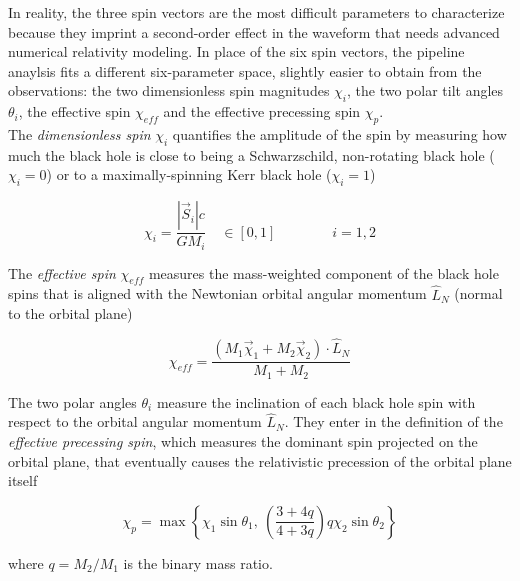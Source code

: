 \documentclass[a4paper,titlepage]{book}     	%
\begin{document}
In reality, the three spin vectors are the most difficult parameters to characterize because they imprint a second-order effect in the waveform that needs advanced numerical relativity modeling. In place of the six spin vectors, the pipeline anaylsis fits a different six-parameter space, slightly easier to obtain from the observations: the two dimensionless spin magnitudes $\chi_i$, the two polar tilt angles $\theta_i$, the effective spin $\chi_{eff}$ and the effective precessing spin $\chi_p$. \\

The \emph{dimensionless spin} $\chi_i$ quantifies the amplitude of the spin by measuring how much the black hole is close to being a Schwarzschild, non-rotating black hole ($\chi_i = 0$) or to a maximally-spinning Kerr black hole ($\chi_i = 1$)

\begin{equation}\label{eq:chispin}
	\chi_i = \frac{|\vec{S}_i| c}{G M_i} \quad  \in [0,1]   \qquad \qquad i=1,2
\end{equation}

The \emph{effective spin} $\chi_{eff}$ measures the mass-weighted component of the black hole spins that is aligned with the Newtonian orbital angular momentum $\hat{L}_N$ (normal to the orbital plane)

\begin{equation}\label{eq:chieff}
	\chi_{eff} = \frac{(M_1 \vec{\chi}_1 + M_2 \vec{\chi}_2)\cdot \hat{L}_N}{M_1 + M_2}
\end{equation}

The two polar angles $\theta_i$ measure the inclination of each black hole spin with respect to the orbital angular momentum $\hat{L}_N$. They enter in the definition of the \emph{effective precessing spin}, which measures the dominant spin projected on the orbital plane, that eventually causes the relativistic precession of the orbital plane itself

\begin{equation}\label{eq:chip}
	\chi_p = \max \left\{\chi_1 \sin\theta_1,~ \left(\frac{3+4q}{4+3q}\right) q\chi_2 \sin\theta_2\right\}
\end{equation}

where $q=M_2/M_1$ is the binary mass ratio. \cite{GWTC-3_interpretation}
\end{document}
